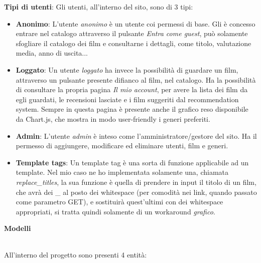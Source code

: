 \documentclass[12pt]{article}
\begin{document}
	\noindent \textbf{Tipi di utenti}: Gli utenti, all'interno del sito, sono di 3 tipi:
	\begin{itemize}
		\item \textbf{Anonimo}: L'utente \textit{anonimo} è un utente coi permessi di base. Gli è concesso entrare nel catalogo attraverso il pulsante \textit{Entra come guest}, può solamente sfogliare il catalogo dei film e consultarne i dettagli, come titolo, valutazione media, anno di uscita...
		 
		\item \textbf{Loggato}: Un utente \textit{loggato} ha invece la possibilità di guardare un film, attraverso un pulsante presente difianco al film, nel catalogo. Ha la possibilità di consultare la propria pagina \textit{Il mio account}, per avere la lista dei film da egli guardati, le recensioni lasciate e i film suggeriti dal recommendation system. Sempre in questa pagina è presente anche il grafico reso disponibile da Chart.js, che mostra in modo user-friendly i generi preferiti.
		\item \textbf{Admin}: L'utente \textit{admin} è inteso come l'amministratore/gestore del sito. Ha il permesso di aggiungere, modificare ed eliminare utenti, film e generi. 
		
		\item \textbf{Template tags}: Un template tag è una sorta di funzione applicabile ad un template. Nel mio caso ne ho implementata solamente una, chiamata \textit{replace\_titles}, la sua funzione è quella di prendere in input il titolo di un film, che avrà dei \_ al posto dei whitespace (per comodità nei link, quando passato come parametro GET), e sostituirà quest'ultimi con dei whitespace appropriati, si tratta quindi solamente di un workaround \textit{grafico}.
	\end{itemize}
	\pagebreak
	
	
	
	\noindent \centerline {\Huge \textbf{Modelli}} \\
	
	\noindent All'interno del progetto sono presenti 4 entità:
	
\end{document}
